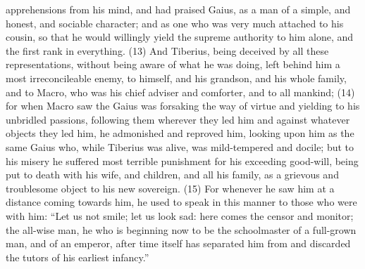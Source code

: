 apprehensions from his mind, and had praised Gaius, as a man of a simple, and honest, and
sociable character; and as one who was very much attached to his cousin, so that he would
willingly yield the supreme authority to him alone, and the first rank in everything. (13) And Tiberius,
being deceived by all these representations, without being aware of what he was doing, left behind
him a most irreconcileable enemy, to himself, and his grandson, and his whole family, and to
Macro, who was his chief adviser and comforter, and to all mankind; (14) for when Macro saw the
Gaius was forsaking the way of virtue and yielding to his unbridled passions, following them
wherever they led him and against whatever objects they led him, he admonished and reproved
him, looking upon him as the same Gaius who, while Tiberius was alive, was mild-tempered and
docile; but to his misery he suffered most terrible punishment for his exceeding good-will, being put
to death with his wife, and children, and all his family, as a grievous and troublesome object to his
new sovereign. (15) For whenever he saw him at a distance coming towards him, he used to speak
in this manner to those who were with him: ``Let us not smile; let us look sad: here comes the
censor and monitor; the all-wise man, he who is beginning now to be the schoolmaster of a
full-grown man, and of an emperor, after time itself has separated him from and discarded the
tutors of his earliest infancy.''

